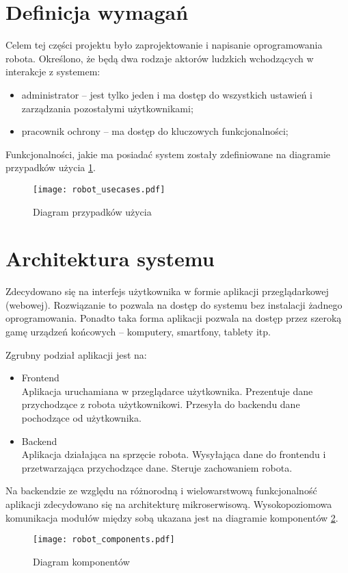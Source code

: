 \section{Definicja wymagań}
Celem tej części projektu było zaprojektowanie i napisanie oprogramowania robota.
Określono, że będą dwa rodzaje aktorów ludzkich wchodzących w interakcje z systemem:
\begin{itemize}
    \item administrator -- jest tylko jeden i ma dostęp do wszystkich ustawień i zarządzania pozostałymi użytkownikami;
    \item pracownik ochrony -- ma dostęp do kluczowych funkcjonalności;
\end{itemize}
Funkcjonalności, jakie ma posiadać system zostały zdefiniowane na diagramie przypadków użycia \ref{rys:usecases}.
\begin{figure}[H]
    \centering \texttt{[image: robot\_usecases.pdf]}
    \caption{Diagram przypadków użycia}
    \label{rys:usecases}
\end{figure}

\section{Architektura systemu}
Zdecydowano się na interfejs użytkownika w formie aplikacji przeglądarkowej (webowej).
Rozwiązanie to pozwala na dostęp do systemu bez instalacji żadnego oprogramowania.
Ponadto taka forma aplikacji pozwala na dostęp przez szeroką gamę urządzeń końcowych -- komputery, smartfony, tablety itp.

Zgrubny podział aplikacji jest na:
\begin{itemize}
    \item Frontend \\
    Aplikacja uruchamiana w przeglądarce użytkownika.
    Prezentuje dane przychodzące z robota użytkownikowi.
    Przesyła do backendu dane pochodzące od użytkownika.
    \item Backend \\
    Aplikacja działająca na sprzęcie robota.
    Wysyłająca dane do frontendu i przetwarzająca przychodzące dane.
    Steruje zachowaniem robota.
\end{itemize}

Na backendzie ze względu na różnorodną i wielowarstwową funkcjonalność aplikacji zdecydowano się na architekturę mikroserwisową.
Wysokopoziomowa komunikacja modułów między sobą ukazana jest na diagramie komponentów \ref{rys:components}.
\begin{figure}[H]
    \centering \texttt{[image: robot\_components.pdf]}
    \caption{Diagram komponentów}
    \label{rys:components}
\end{figure}

